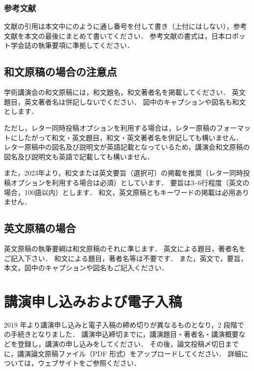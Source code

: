 \subsubsection{参考文献}
文献の引用は本文中に\cite{website}\cite{yamada2000}のように通し番号を付して書き（上付にはしない），参考文献を本文の最後にまとめて書いてください．
参考文献の書式は，日本ロボット学会誌の執筆要項\cite{rsj_rules}に準拠してください．

\subsection{和文原稿の場合の注意点}
学術講演会の和文原稿には，和文題名，和文著者名を掲載してください．
英文題目，英文著者名は併記しないでください．
図中のキャプションや図名も和文とします．

ただし，レター同時投稿オプションを利用する場合は，レター原稿のフォーマットにしたがって和文・英文題目，和文・英文著者名を併記しても構いません．
レター原稿中の図名及び説明文が英語記載となっているため，講演会和文原稿の図名及び説明文も英語で記載しても構いません．

また，2023年より，和文または英文要旨（選択可）の掲載を推奨（レター同時投稿オプションを利用する場合は必須）としています．
要旨は3\textasciitilde6行程度（英文の場合，100語以内）とします．
和文，英文原稿ともキーワードの掲載は必用ありません．

\subsection{英文原稿の場合}
英文原稿の執筆要綱は和文原稿のそれに準じます．
英文による題目，著者名をご記入下さい．
和文による題目，著者名等は不要です．
また，英文で，要旨，本文，図中のキャプションや図名もご記入ください．

\section{講演申し込みおよび電子入稿}
2019 年より講演申し込みと電子入稿の締め切りが異なるものとなり，2 段階での手続きとなりました．
講演申込締切までに，講演題目・著者名・講演概要などを登録し，講演の申し込みをしてください．
その後，論文投稿〆切日までに，講演論文原稿ファイル（PDF 形式）をアップロードしてください．
詳細については，ウェブサイト\cite{website}をご参照ください．


